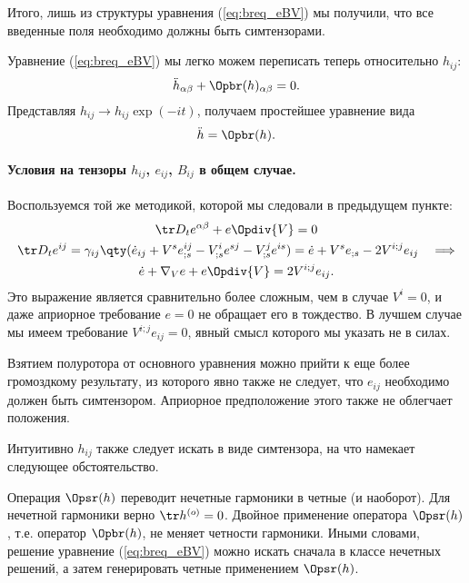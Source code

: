 \documentclass[\docroot/reports/draft/report.tex]{subfiles}
\begin{document}
    Итого, лишь из структуры уравнения (\ref{eq:breq_eBV}) мы получили, что все введенные поля необходимо должны быть симтензорами.

    Уравнение (\ref{eq:breq_eBV}) мы легко можем переписать теперь относительно $h_{ij}$:
    \begin{equation}
        \ddot{h}_{\alpha\beta} + \Opbr(h)_{\alpha\beta} = 0 .
    \end{equation}
    Представляя $h_{ij} \to h_{ij} \exp(-it)$, получаем простейшее уравнение вида
    \begin{equation}
        \ddot{h} = \Opbr(h) .
    \end{equation}

    \paragraph{Условия на тензоры $h_{ij}$, $e_{ij}$, $B_{ij}$ в общем случае.}

    Воспользуемся той же методикой, которой мы следовали в предыдущем пункте:
    \begin{gather*}
        \tr D_t{e^{\alpha\beta}} + e \Opdiv{V} = 0 \\
        \tr D_t{e^{ij}} = \gamma_{ij} \qty(
            \dot{e}_{ij} + V^s e^{ij}_{;s} - V^i_{;s} e^{sj} - V^j_{;s} e^{is}
        ) = \dot{e} + V^s e_{;s} - 2 V^{i;j} e_{ij} \quad\Longrightarrow\\
        \dot{e} + \nabla_V e + e \Opdiv{V} = 2 V^{i;j} e_{ij} .
    \end{gather*}
    Это выражение является сравнительно более сложным, чем в случае $V^i = 0$, и даже априорное требование $e = 0$ не обращает его в тождество. В лучшем случае мы имеем требование $V^{i;j} e_{ij} = 0$, явный смысл которого мы указать не в силах.

    Взятием полуротора от основного уравнения можно прийти к еще более громоздкому результату, из которого явно также не следует, что $e_{ij}$ необходимо должен быть симтензором. Априорное предположение этого также не облегчает положения.

    Интуитивно $h_{ij}$ также следует искать в виде симтензора, на что намекает следующее обстоятельство.

    Операция $\Opsr(h)$ переводит нечетные гармоники в четные (и наоборот). Для нечетной гармоники верно $\tr h^{(o)} = 0$. Двойное применение оператора $\Opsr(h)$, т.е. оператор $\Opbr(h)$, не меняет четности гармоники. Иными словами, решение уравнение (\ref{eq:breq_eBV}) можно искать сначала в классе нечетных решений, а затем генерировать четные применением $\Opsr(h)$.
\end{document}

